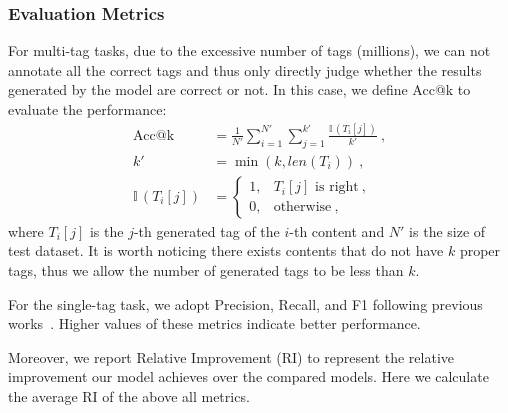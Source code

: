 \subsubsection{Evaluation Metrics}
For multi-tag tasks, due to the excessive number of tags (millions), we can not annotate all the correct tags and thus only directly judge whether the results generated by the model are correct or not. In this case, we define Acc@k to evaluate the performance:
\begin{equation}
\begin{aligned}
\operatorname{Acc@k} &=\frac{1}{N'}\sum_{i=1}^{N'}\sum_{j=1}^{k'}  \frac{\mathbb{I}\,{\left(T_i[j]\right)}}{k'}~, \\
k' &= \min(k, len(T_i))~,\\
\mathbb{I}\,{\left(T_i[j]\right)}&= \begin{cases}
1, & \text{$T_i[j]$ is right}~,\\
0, &  \text{otherwise}~,
\end{cases}
\end{aligned}
\end{equation}
where $T_i[j]$ is the $j$-th generated tag of the $i$-th content and $N'$ is the size of test dataset. It is worth noticing there exists contents that do not have $k$ proper tags, thus we allow the number of generated tags to be less than $k$. 

For the single-tag task, we adopt Precision, Recall, and F1 following previous works~\cite{li2023taggpt,chae2023large}. Higher values of these metrics indicate better performance.

Moreover, we report Relative Improvement (RI) to represent the relative improvement our model achieves over the compared models. Here we calculate the average RI of the above all metrics.

